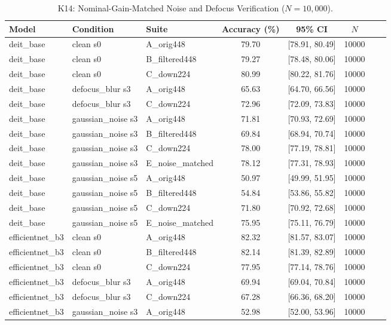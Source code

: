 \begin{table}[t]
\centering
\caption{K14: Nominal-Gain-Matched Noise and Defocus Verification ($N=10{,}000$).}
\label{tab:k14_matched_noise}
\small
\begin{tabular}{lllccccc}
\toprule
Model & Condition & Suite & Accuracy (\%) & 95\% CI & $N$ \\
\midrule
deit_base & clean s0 & A_orig448 & 79.70 & [78.91, 80.49] & 10000 \\
deit_base & clean s0 & B_filtered448 & 79.27 & [78.48, 80.06] & 10000 \\
deit_base & clean s0 & C_down224 & 80.99 & [80.22, 81.76] & 10000 \\
deit_base & defocus_blur s3 & A_orig448 & 65.63 & [64.70, 66.56] & 10000 \\
deit_base & defocus_blur s3 & C_down224 & 72.96 & [72.09, 73.83] & 10000 \\
deit_base & gaussian_noise s3 & A_orig448 & 71.81 & [70.93, 72.69] & 10000 \\
deit_base & gaussian_noise s3 & B_filtered448 & 69.84 & [68.94, 70.74] & 10000 \\
deit_base & gaussian_noise s3 & C_down224 & 78.00 & [77.19, 78.81] & 10000 \\
deit_base & gaussian_noise s3 & E_noise_matched & 78.12 & [77.31, 78.93] & 10000 \\
deit_base & gaussian_noise s5 & A_orig448 & 50.97 & [49.99, 51.95] & 10000 \\
deit_base & gaussian_noise s5 & B_filtered448 & 54.84 & [53.86, 55.82] & 10000 \\
deit_base & gaussian_noise s5 & C_down224 & 71.80 & [70.92, 72.68] & 10000 \\
deit_base & gaussian_noise s5 & E_noise_matched & 75.95 & [75.11, 76.79] & 10000 \\
efficientnet_b3 & clean s0 & A_orig448 & 82.32 & [81.57, 83.07] & 10000 \\
efficientnet_b3 & clean s0 & B_filtered448 & 82.14 & [81.39, 82.89] & 10000 \\
efficientnet_b3 & clean s0 & C_down224 & 77.95 & [77.14, 78.76] & 10000 \\
efficientnet_b3 & defocus_blur s3 & A_orig448 & 69.94 & [69.04, 70.84] & 10000 \\
efficientnet_b3 & defocus_blur s3 & C_down224 & 67.28 & [66.36, 68.20] & 10000 \\
efficientnet_b3 & gaussian_noise s3 & A_orig448 & 52.98 & [52.00, 53.96] & 10000 \\

\end{tabular}
\end{table}
